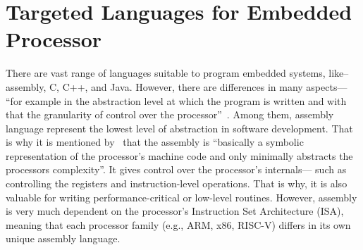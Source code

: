 \section{Targeted Languages for Embedded Processor}
There are vast range of languages suitable to program embedded systems, like-- assembly, C, C++, and Java. However, there are differences in many aspects--- ``for example in the abstraction level at which the program is written and with that the granularity of control over the processor''~\cite{Gajski.2009}. Among them, assembly language represent the lowest level of abstraction in software development. That is why it is mentioned by~\cite{Gajski.2009} that the assembly is ``basically a symbolic representation of the processor’s machine code and only minimally abstracts the processors complexity''. It gives control over the processor's internals--- such as controlling the registers and instruction-level operations. That is why, it is also valuable for writing performance-critical or low-level routines. However, assembly is very much dependent on the processor's Instruction Set Architecture (ISA), meaning that each processor family (e.g., ARM, x86, RISC-V) differs in its own unique assembly language.